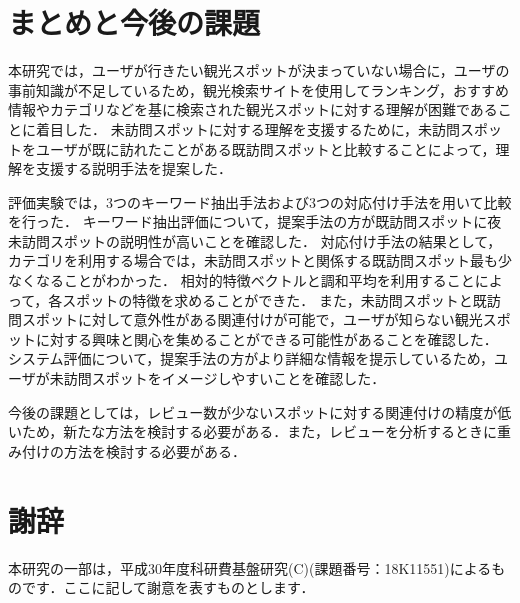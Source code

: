\documentclass{deimj}
\begin{document}
\section{まとめと今後の課題}
\label{sec:まとめと今後の課題}

本研究では，ユーザが行きたい観光スポットが決まっていない場合に，ユーザの事前知識が不足しているため，観光検索サイトを使用してランキング，おすすめ情報やカテゴリなどを基に検索された観光スポットに対する理解が困難であることに着目した．
未訪問スポットに対する理解を支援するために，未訪問スポットをユーザが既に訪れたことがある既訪問スポットと比較することによって，理解を支援する説明手法を提案した．

評価実験では，3つのキーワード抽出手法および3つの対応付け手法を用いて比較を行った．
キーワード抽出評価について，提案手法の方が既訪問スポットに夜未訪問スポットの説明性が高いことを確認した．
対応付け手法の結果として，カテゴリを利用する場合では，未訪問スポットと関係する既訪問スポット最も少なくなることがわかった．
相対的特徴ベクトルと調和平均を利用することによって，各スポットの特徴を求めることができた．
また，未訪問スポットと既訪問スポットに対して意外性がある関連付けが可能で，ユーザが知らない観光スポットに対する興味と関心を集めることができる可能性があることを確認した．
システム評価について，提案手法の方がより詳細な情報を提示しているため，ユーザが未訪問スポットをイメージしやすいことを確認した．

今後の課題としては，レビュー数が少ないスポットに対する関連付けの精度が低いため，新たな方法を検討する必要がある．また，レビューを分析するときに重み付けの方法を検討する必要がある．


\section*{謝辞}
本研究の一部は，平成30年度科研費基盤研究(C)(課題番号：18K11551)によるものです．ここに記して謝意を表すものとします．
\end{document}
